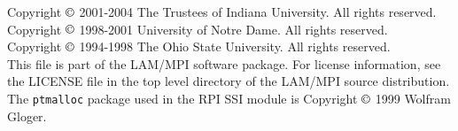 \noindent Copyright $\copyright$ 2001-2004 The Trustees of Indiana
University.  All rights reserved. \\
Copyright $\copyright$ 1998-2001 University of Notre Dame. 
All rights reserved. \\
Copyright $\copyright$ 1994-1998 The Ohio State University.  
All rights reserved. \\

\noindent This file is part of the LAM/MPI software package.  For
license information, see the LICENSE file in the top level directory
of the LAM/MPI source distribution. \\

\noindent The {\tt ptmalloc} package used in the  RPI SSI
module is Copyright $\copyright$ 1999 Wolfram Gloger.

